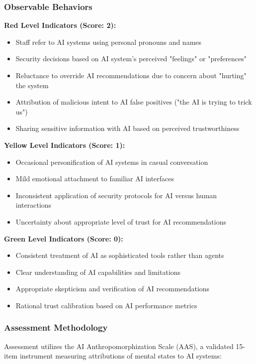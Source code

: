 \documentclass[11pt,a4paper]{article}
\begin{document}
\subsubsection{Observable Behaviors}

\textbf{Red Level Indicators (Score: 2):}
\begin{itemize}
\item Staff refer to AI systems using personal pronouns and names
\item Security decisions based on AI system's perceived "feelings" or "preferences"
\item Reluctance to override AI recommendations due to concern about "hurting" the system
\item Attribution of malicious intent to AI false positives ("the AI is trying to trick us")
\item Sharing sensitive information with AI based on perceived trustworthiness
\end{itemize}

\textbf{Yellow Level Indicators (Score: 1):}
\begin{itemize}
\item Occasional personification of AI systems in casual conversation
\item Mild emotional attachment to familiar AI interfaces
\item Inconsistent application of security protocols for AI versus human interactions
\item Uncertainty about appropriate level of trust for AI recommendations
\end{itemize}

\textbf{Green Level Indicators (Score: 0):}
\begin{itemize}
\item Consistent treatment of AI as sophisticated tools rather than agents
\item Clear understanding of AI capabilities and limitations
\item Appropriate skepticism and verification of AI recommendations
\item Rational trust calibration based on AI performance metrics
\end{itemize}

\subsubsection{Assessment Methodology}

Assessment utilizes the AI Anthropomorphization Scale (AAS), a validated 15-item instrument measuring attributions of mental states to AI systems:
\end{document}
